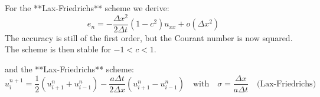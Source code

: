 For the **Lax-Friedrichs** scheme we derive:
\begin{equation*}
    e_n = - \frac{\Delta x^2}{2\Delta t}(1-c^2)u_{xx} + o(\Delta x^2)
\end{equation*}
The accuracy is still of the first order, but the Courant number is now squared. The scheme is then stable for $-1 < c < 1$.

and the **Lax-Friedrichs** scheme:
\begin{equation*}
    u^{n+1}_i = \frac{1}{2}(u^n_{i+1} + u^n_{i-1}) - \frac{a \Delta t}{2\Delta x}(u^n_{i+1} - u^n_{i-1}) \quad \textrm{with} \quad \sigma = \frac{\Delta x}{a \Delta t} \quad \textrm{(Lax-Friedrichs)}
\end{equation*}
